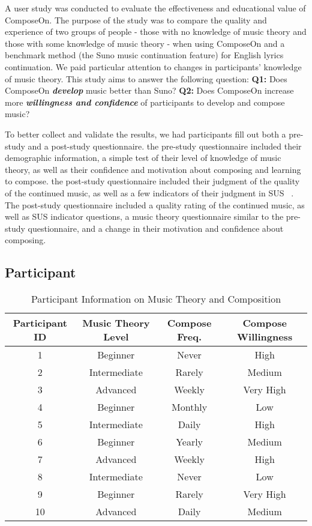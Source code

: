 A user study was conducted to evaluate the effectiveness and educational value of ComposeOn. The purpose of the study was to compare the quality and experience of two groups of people - those with no knowledge of music theory and those with some knowledge of music theory - when using ComposeOn and a benchmark method (the Suno music continuation feature) for English lyrics continuation. We paid particular attention to changes in participants' knowledge of music theory. This study aims to answer the following question:
\textbf{Q1:} Does ComposeOn \textbf{\textit{develop}} music better than Suno?
\textbf{Q2:} Does ComposeOn increase more \textbf{\textit{willingness and confidence}} of participants to develop and compose music? 

To better collect and validate the results, we had participants fill out both a pre-study and a post-study questionnaire. the pre-study questionnaire included their demographic information, a simple test of their level of knowledge of music theory, as well as their confidence and motivation about composing and learning to compose. the post-study questionnaire included their judgment of the quality of the continued music, as well as a few indicators of their judgment in SUS ~\cite{r23}. The post-study questionnaire included a quality rating of the continued music, as well as SUS indicator questions, a music theory questionnaire similar to the pre-study questionnaire, and a change in their motivation and confidence about composing.

\subsection{Participant}

\begin{table}[h]
\centering
\begin{tabular}{|c|c|c|c|}
\hline
Participant ID & Music Theory Level & Compose Freq. & Compose Willingness \\
\hline
1 & Beginner & Never & High \\
2 & Intermediate & Rarely & Medium \\
3 & Advanced & Weekly & Very High \\
4 & Beginner & Monthly & Low \\
5 & Intermediate & Daily & High \\
6 & Beginner & Yearly & Medium \\
7 & Advanced & Weekly & High \\
8 & Intermediate & Never & Low \\
9 & Beginner & Rarely & Very High \\
10 & Advanced & Daily & Medium \\
\hline
\end{tabular}
\caption{Participant Information on Music Theory and Composition}
\label{tab:musicinfo}
\end{table}

